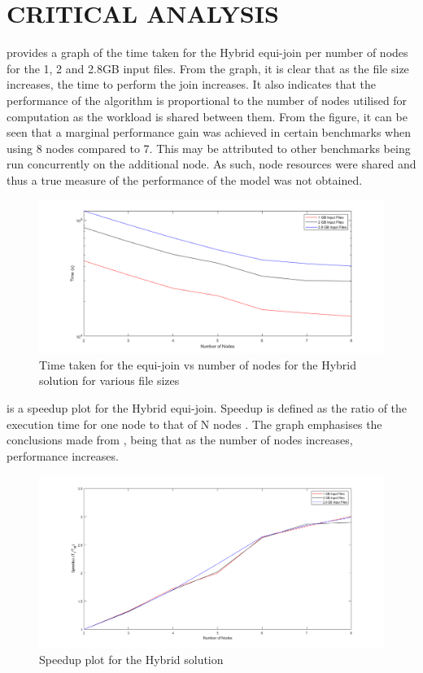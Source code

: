 \documentclass[12pt,twocolumn]{witseiepaper}
\begin{document}
\section{CRITICAL ANALYSIS}

 provides a graph of the time taken for the Hybrid equi-join per number of nodes for the 1, 2 and 2.8GB input files. From the graph, it is clear that as the file size increases, the time to perform the join increases. It also indicates that the performance of the algorithm is proportional to the number of nodes utilised for computation as the workload is shared between them. From the figure, it can be seen that a marginal performance gain was achieved in certain benchmarks when using 8 nodes compared to 7. This may be attributed to other benchmarks being run concurrently on the additional node. As such, node resources were shared and thus a true measure of the performance of the model was not obtained.

\begin{figure}[h]
	\centering
	\includegraphics[width=1\columnwidth]{hybrid-time.png}
	\caption{Time taken for the equi-join vs number of nodes for the Hybrid solution for various file sizes}
	\raggedright
	\label{fig:resultsH}	
\end{figure}

 is a speedup plot for the Hybrid equi-join. Speedup is defined as the ratio of the execution time for one node to that of N nodes \cite{speedup}. The graph emphasises the conclusions made from , being that as the number of nodes increases, performance increases.

\begin{figure}[h]
	\centering
	\includegraphics[width=1\columnwidth]{hybrid-speedup.png}
	\caption{Speedup plot for the Hybrid solution}
	\raggedright
	\label{fig:speedUpH}	
\end{figure}
\end{document}
